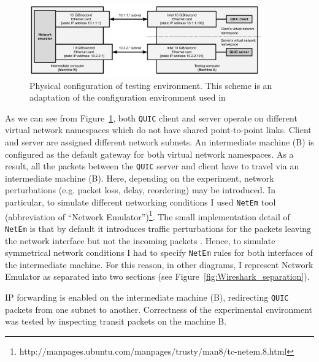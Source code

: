 \documentclass[12pt,a4paper,twoside,openright]{report}
\begin{document}
    \begin{figure}[ht]
    \centering
    \includegraphics[width=0.9\textwidth]{figs/Physical_testing_environment.png}
    \caption{Physical configuration of testing environment. This scheme is an adaptation of the configuration environment used in  \cite{Making_QUIC_Quicker}}
    \label{fig:Physical_testing_environment}
    \end{figure}
    
    As we can see from Figure~\ref{fig:Physical_testing_environment}, both \texttt{QUIC} client and server operate on different virtual network namespaces which do not have shared point-to-point links.
    Client and server are assigned different network subnets.
    An intermediate machine (B) is configured as the default gateway for both virtual network namespaces.
    As a result, all the packets between the \texttt{QUIC} server and client have to travel via an intermediate machine (B).
    Here, depending on the experiment, network perturbations (e.g. packet loss, delay, reordering) may be introduced.
    In particular, to simulate different networking conditions I used \texttt{NetEm} tool (abbreviation of \enquote{Network Emulator})\footnote{http://manpages.ubuntu.com/manpages/trusty/man8/tc-netem.8.html}.
    The small implementation detail of \texttt{NetEm} is that by default it introduces traffic perturbations for the packets leaving the network interface but not the incoming packets \cite{Ubuntu_Manpage_NetEm}.
    Hence, to simulate symmetrical network conditions I had to specify \texttt{NetEm} rules for both interfaces of the intermediate machine.
    For this reason, in other diagrams, I represent Network Emulator as separated into two sections (see Figure~\ref{fig:Wireshark_separation}).
    
    
    IP forwarding is enabled on the intermediate machine (B), redirecting \texttt{QUIC} packets from one subnet to another.
    Correctness of the experimental environment was tested by inspecting transit packets on the machine B.
\end{document}
